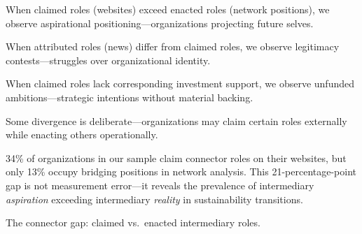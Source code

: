 \documentclass[../main.tex]{subfiles}
\begin{document}
\begin{description}[leftmargin=0.5cm, itemsep=0.3em]
\item[Aspiration Gaps] When claimed roles (websites) exceed enacted roles (network positions), we observe aspirational positioning---organizations projecting future selves.

\item[Perception Gaps] When attributed roles (news) differ from claimed roles, we observe legitimacy contests---struggles over organizational identity.

\item[Resource Gaps] When claimed roles lack corresponding investment support, we observe unfunded ambitions---strategic intentions without material backing.

\item[Strategic Gaps] Some divergence is deliberate---organizations may claim certain roles externally while enacting others operationally.
\end{description}

\begin{insightbox}
34\% of organizations in our sample claim connector roles on their websites, but only 13\% occupy bridging positions in network analysis. This 21-percentage-point gap is not measurement error---it reveals the prevalence of intermediary \textit{aspiration} exceeding intermediary \textit{reality} in sustainability transitions.
\end{insightbox}

\begin{marginfigure}
\centering
{}
\caption{The connector gap: claimed vs.\ enacted intermediary roles.}
\end{marginfigure}
\end{document}

